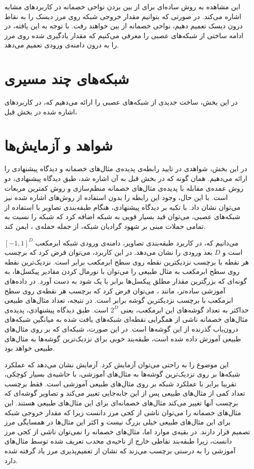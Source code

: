 \documentclass[12pt,onecolumn,a4paper]{article}
\begin{document}
این مشاهده به روش ساده‌ای برای از بین بردن نواحی خصمانه در کاربردهای مشابه اشاره می‌کند. در صورتی که بتوانیم مقدار خروجی شبکه روی مرز دیسک را به نقاط درون دیسک تعمیم دهیم، نواحی خصمانه از بین خواهند رفت. با توجه به این یافته، در ادامه ساختی از شبکه‌های عصبی را معرفی می‌کنیم که مقدار یادگیری شده روی مرز را به درون دامنه‌ی ورودی تعمیم می‌دهد.

\section{شبکه‌های چند مسیری}
در این بخش، ساخت جدیدی از شبکه‌های عصبی را ارائه می‌دهیم که، در کاربردهای اشاره شده در بخش قبل، 

\section{شواهد و آزمایش‌ها}
در این بخش، شواهدی در تایید رابطه‌ی پدیده‌ی مثال‌های خصمانه و دیدگاه پیشنهادی را ارائه می‌دهیم. همان گونه که در بخش قبل به آن اشاره شد، طبق دیدگاه پیشنهادی، دو روش عمده‌ی مقابله با پدیده‌ی مثال‌های خصمانه منظم‌سازی و روش کمترین مربعات است. با این  حال، وجود این رابطه را بدون استفاده از روش‌های اشاره شده نیز می‌توان نشان داد. با تکیه بر دیدگاه پیشنهادی، هنگام طبقه‌بندی تصاویر با استفاده از شبکه‌های عصبی، می‌توان قید بسیار قویی به شبکه اضافه کرد که شبکه را نسبت به تمامی حملات مبنی بر شهود گرادیان  شبکه، از جمله حمله‌ی ، ایمن کند.

می‌دانیم که، در کاربرد طبقه‌بندی تصاویر، دامنه‌ی ورودی شبکه ابرمکعب $[-1,1]^D$ است و $D$ بعد ورودی را نشان می‌دهد. در این کاربرد، می‌توان فرض کرد که برچسب هر نقطه با برچسب نزدیکترین نقطه روی سطح ابرمکعب برابر است. نزدیک‌ترین نقطه روی سطح ابرمکعب به مثال طبیعی را می‌توان با نورمال کردن مقادیر پیکسل‌ها، به گونه‌ای که بزرگترین مقدار مطلق پیکسل‌ها برابر با یک شود به دست آورد. در داده‌های آموزشی ساده‌تر، مانند 
، 
می‌توان فرض کرد که برچسب هر نقطه‌ی روی سطح ابرمکعب با برچسب نزدیکترین گوشه برابر است. در نتیجه، تعداد مثال‌های طبیعی حداکثر به تعداد گوشه‌های این ابرمکعب، یعنی $2^D$ است. طبق دیدگاه پیشنهادی، پدیده‌ی مثال‌های خصمانه ناشی از همگرایی نقطه‌ای شبکه‌ها‌ی یافت شده به میانگین شبکه‌های درون‌یاب گذرنده از این گوشه‌ها است. در این صورت، شبکه‌ای که بر روی مثال‌های طبیعی آموزش داده شده است،  طبقه‌بند خوبی برای نزدیک‌ترین گوشه‌ها به مثال‌های طبیعی خواهد بود. 

 این موضوع را به راحتی می‌توان آزمایش کرد. آزمایش نشان می‌دهد که عملکرد شبکه‌ها بر روی نزدیک‌ترین گوشه‌ها به مثال‌های آموزشی، با حاشیه‌ی بسیار کوچکی، تقریبا برایر با عملکرد شبکه بر روی مثال‌های طبیعی آموزشی است. فقط برچسب تعداد کمی از مثال‌های طبیعی پس از این جابه‌جایی تغییر می‌کند و تصاویر گوشه‌ای که برچسب آنها تغییر می‌کند مثال‌های خصمانه‌ای برای این مثال‌های طبیعی هستند. این مثال‌های خصمانه را می‌توان ناشی از کجی مرز دانست زیرا که مقدار خروجی شبکه برای این مثال‌های طبیعی خیلی بزرگ نیست و اکثر این مثال‌ها در همسایگی مرز تصمیم قرار دارند. در بقیه‌ی موارد اما، مثال‌های خصمانه را نمی‌توان ناشی از کجی مرز دانست، زیرا طبقه‌بند نقاطی خارج از ناحیه‌ی محدب تعریف شده توسط مثال‌های آموزشی را به درستی برچسب می‌زند که نشان از تعمیم‌پذیری مرز یاد گرفته شده دارد.
\end{document}
